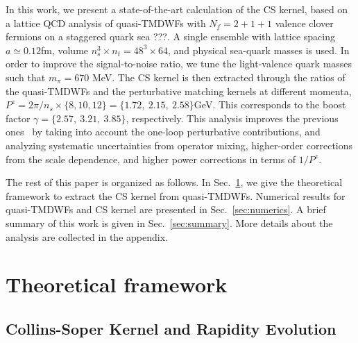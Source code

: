 \documentclass[prd,aps,twocolumn,preprintnumbers, showpacs, nofootinbib,superscriptaddress,notitlepage]{revtex4-1}
\newcommand{\red}[1]{\textcolor{red}{#1}} %
\newcommand\bl{\color{blue}}
\begin{document}
In this work, we present a state-of-the-art calculation of the CS kernel, based on a lattice QCD analysis of quasi-TMDWFs with {\bl  $N_f=2+1+1$  valence clover fermions on a staggered quark sea ???.} A single ensemble with lattice spacing {\bl $a\simeq0.12$fm,  volume $n_s^3\times n_t=48^3\times64$, and  physical sea-quark masses is used}. In order to improve the signal-to-noise ratio, we tune the light-valence quark {\bl masses such that} $m_\pi = 670$ MeV.  The CS  kernel is then extracted through the ratios of the quasi-TMDWFs and the perturbative matching kernels at different momenta, $P^z=2\pi/n_s\times\{8,10,12\}=\{1.72,~2.15,~2.58\}$GeV. This  corresponds to the boost factor  $\gamma=\{2.57,~3.21,~3.85\}$, respectively.
This analysis improves the previous ones~\cite{LatticeParton:2020uhz,Li:2021wvl} by taking into account  the one-loop perturbative contributions, and analyzing  systematic uncertainties from {\bl operator} mixing,  higher-order corrections from the scale dependence, and higher power corrections in terms of $1/P^z$.  
 

The rest of this paper is organized as follows. 
In Sec.~\ref{sec:framework}, we give the theoretical framework to extract the CS kernel from  quasi-TMDWFs. Numerical results for quasi-TMDWFs and CS kernel are {\bl presented in} Sec.~\ref{sec:numerics}. A brief  summary of this work is given in Sec.~\ref{sec:summary}.  More details about the analysis are collected in the appendix. 



  
\section{Theoretical framework}
\label{sec:framework}
 

   
\subsection{Collins-Soper Kernel and Rapidity Evolution}
\end{document}
